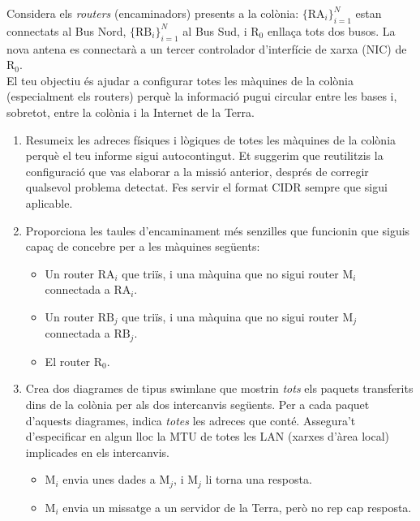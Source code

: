 \noindent
Considera els \textit{routers} (encaminadors) presents a la colònia: $\{\textrm{RA}_i\}_{i=1}^{N}$ estan connectats al Bus Nord, $\{\textrm{RB}_i\}_{i=1}^{N}$ al Bus Sud, i $\textrm{R}_0$ enllaça tots dos busos. La nova antena es connectarà a un tercer controlador d'interfície de xarxa (NIC) de $\textrm{R}_0$.\\

\noindent
El teu objectiu és ajudar a configurar totes les màquines de la colònia (especialment els routers) perquè la informació pugui circular entre les bases i, sobretot, entre la colònia i la Internet de la Terra.
\vspace{-0.2cm}

\begin{enumerate}[itemsep=0.1cm]
\item Resumeix les adreces físiques i lògiques de totes les màquines de la colònia perquè el teu informe sigui autocontingut. Et suggerim que reutilitzis la configuració que vas elaborar a la missió anterior, després de corregir qualsevol problema detectat. Fes servir el format CIDR sempre que sigui aplicable.

\item Proporciona les taules d'encaminament més senzilles que funcionin que siguis capaç de concebre per a les màquines següents:
\begin{itemize}
\item Un router $\textrm{RA}_i$ que triïs,
i una màquina que no sigui router $\textrm{M}_i$ connectada a $\textrm{RA}_i$.
\item Un router $\textrm{RB}_j$ que triïs,
i una màquina que no sigui router $\textrm{M}_j$ connectada a $\textrm{RB}_j$.
\item El router $\textrm{R}_0$.
\end{itemize}

\item Crea dos diagrames de tipus swimlane que mostrin \textit{tots} els paquets transferits dins de la colònia per als dos intercanvis següents. Per a cada paquet d'aquests diagrames, indica \textit{totes} les adreces que conté. Assegura't d'especificar en algun lloc la MTU de totes les LAN (xarxes d'àrea local) implicades en els intercanvis.
\begin{itemize}
\item $\textrm{M}_i$ envia unes dades a $\textrm{M}_j$, i $\textrm{M}_j$ li torna una resposta.
\item $\textrm{M}_i$ envia un missatge a un servidor de la Terra, però no rep cap resposta.
\end{itemize}
\end{enumerate}

